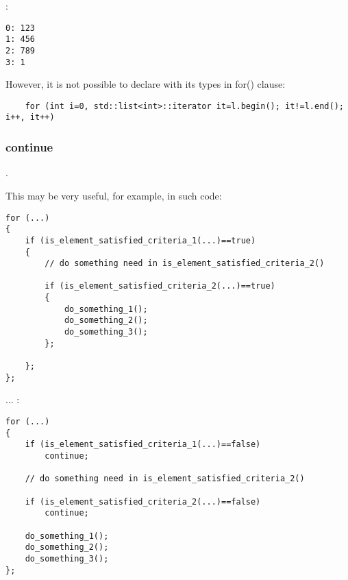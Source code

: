 

:

\begin{lstlisting}
0: 123
1: 456
2: 789
3: 1
\end{lstlisting}

{However, it is not possible to declare  with its types in for() clause}:

\begin{lstlisting}
	for (int i=0, std::list<int>::iterator it=l.begin(); it!=l.end(); i++, it++)
\end{lstlisting}

\subsubsection{continue}

 .

{This may be very useful, for example, in such code}:

\begin{lstlisting}
for (...)
{
	if (is_element_satisfied_criteria_1(...)==true)
	{
		// do something need in is_element_satisfied_criteria_2()

		if (is_element_satisfied_criteria_2(...)==true)
		{
			do_something_1();
			do_something_2();
			do_something_3();
		};

	};
};
\end{lstlisting}

... :

\begin{lstlisting}
for (...)
{
	if (is_element_satisfied_criteria_1(...)==false)
		continue;

	// do something need in is_element_satisfied_criteria_2()

	if (is_element_satisfied_criteria_2(...)==false)
		continue;

	do_something_1();
	do_something_2();
	do_something_3();
};
\end{lstlisting}

